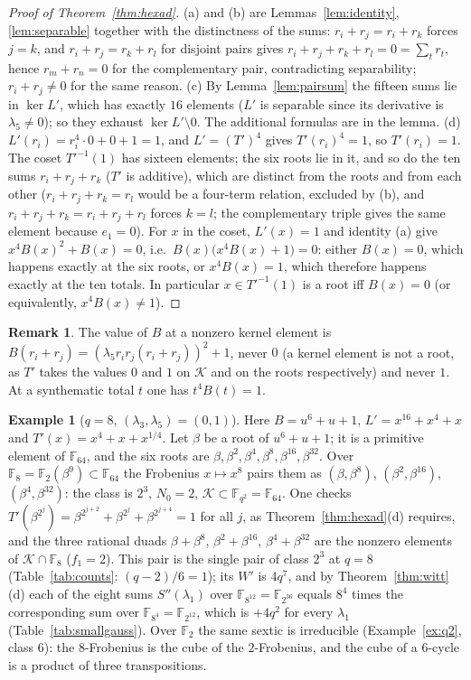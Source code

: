 \documentclass[12pt,a4paper]{amsart}
\theoremstyle{definition}
\newtheorem{remark}[theorem]{Remark}
\newtheorem{example}[theorem]{Example}
\newcommand{\F}{\mathbb{F}}
\newcommand{\Kk}{\mathcal{K}}
\newcommand{\Spp}{S''}
\begin{document}
\begin{proof}[Proof of Theorem~\ref{thm:hexad}]
(a) and (b) are Lemmas~\ref{lem:identity}, \ref{lem:separable} together with the distinctness of the sums: $r_i+r_j=r_i+r_k$ forces $j=k$, and $r_i+r_j=r_k+r_l$ for disjoint pairs gives $r_i+r_j+r_k+r_l=0=\sum_tr_t$, hence $r_m+r_n=0$ for the complementary pair, contradicting separability; $r_i+r_j\ne0$ for the same reason. (c) By Lemma~\ref{lem:pairsum} the fifteen sums lie in $\ker L'$, which has exactly $16$ elements ($L'$ is separable since its derivative is $\lambda_5\ne0$); so they exhaust $\ker L'\setminus0$. The additional formulas are in the lemma. (d) $L'(r_i)=r_i^4\cdot0+0+1=1$, and $L'=(T')^4$ gives $T'(r_i)^4=1$, so $T'(r_i)=1$. The coset $T'^{-1}(1)$ has sixteen elements; the six roots lie in it, and so do the ten sums $r_i+r_j+r_k$ ($T'$ is additive), which are distinct from the roots and from each other ($r_i+r_j+r_k=r_l$ would be a four-term relation, excluded by (b), and $r_i+r_j+r_k=r_i+r_j+r_l$ forces $k=l$; the complementary triple gives the same element because $e_1=0$). For $x$ in the coset, $L'(x)=1$ and identity (a) give $x^4B(x)^2+B(x)=0$, i.e.\ $B(x)\bigl(x^4B(x)+1\bigr)=0$: either $B(x)=0$, which happens exactly at the six roots, or $x^4B(x)=1$, which therefore happens exactly at the ten totals. In particular $x\in T'^{-1}(1)$ is a root iff $B(x)=0$ (or equivalently, $x^4B(x)\ne1$).
\end{proof}

\begin{remark}
The value of $B$ at a nonzero kernel element is $B(r_i+r_j)=(\lambda_5r_ir_j(r_i+r_j))^2+1$, never $0$ (a kernel element is not a root, as $T'$ takes the values $0$ and $1$ on $\Kk$ and on the roots respectively) and never $1$. At a synthematic total $t$ one has $t^4B(t)=1$.
\end{remark}

\begin{example}[$q=8$, $(\lambda_3,\lambda_5)=(0,1)$]\label{ex:q8}
Here $B=u^6+u+1$, $L'=x^{16}+x^4+x$ and $T'(x)=x^4+x+x^{1/4}$. Let $\beta$ be a root of $u^6+u+1$; it is a primitive element of $\F_{64}$, and the six roots are $\beta,\beta^2,\beta^4,\beta^8,\beta^{16},\beta^{32}$. Over $\F_8=\F_2(\beta^9)\subset\F_{64}$ the Frobenius $x\mapsto x^8$ pairs them as $(\beta,\beta^8)$, $(\beta^2,\beta^{16})$, $(\beta^4,\beta^{32})$: the class is $2^3$, $N_0=2$, $\Kk\subset\F_{q^2}=\F_{64}$. One checks $T'(\beta^{2^j})=\beta^{2^{j+2}}+\beta^{2^j}+\beta^{2^{j+4}}=1$ for all $j$, as Theorem~\ref{thm:hexad}(d) requires, and the three rational duads $\beta+\beta^8$, $\beta^2+\beta^{16}$, $\beta^4+\beta^{32}$ are the nonzero elements of $\Kk\cap\F_8$ ($f_1=2$). This pair is the single pair of class $2^3$ at $q=8$ (Table~\ref{tab:counts}: $(q-2)/6=1$); its $W'$ is $4q^7$, and by Theorem~\ref{thm:witt}(d) each of the eight sums $\Spp(\lambda_1)$ over $\F_{8^{12}}=\F_{2^{36}}$ equals $8^4$ times the corresponding sum over $\F_{8^4}=\F_{2^{12}}$, which is $+4q^2$ for every $\lambda_1$ (Table~\ref{tab:smallgauss}). Over $\F_2$ the same sextic is irreducible (Example~\ref{ex:q2}, class $6$): the $8$-Frobenius is the cube of the $2$-Frobenius, and the cube of a $6$-cycle is a product of three transpositions.
\end{example}
\end{document}
